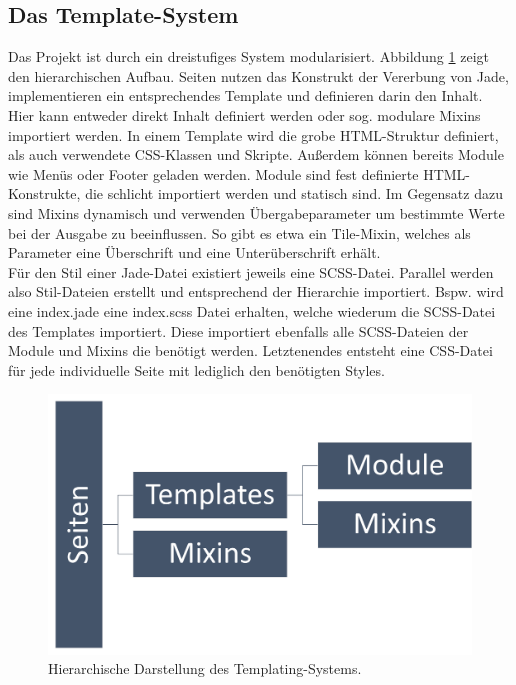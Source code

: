 \subsection{Das Template-System}
Das Projekt ist durch ein dreistufiges System modularisiert. Abbildung \ref{pre:system} zeigt den hierarchischen Aufbau. Seiten nutzen das Konstrukt der Vererbung von Jade, implementieren ein entsprechendes Template und definieren darin den Inhalt. Hier kann entweder direkt Inhalt definiert werden oder sog. modulare Mixins importiert werden.
In einem Template wird die grobe HTML-Struktur definiert, als auch verwendete CSS-Klassen und Skripte. Außerdem können bereits Module wie Menüs oder Footer geladen werden.
Module sind fest definierte HTML-Konstrukte, die schlicht importiert werden und statisch sind.
Im Gegensatz dazu sind Mixins dynamisch und verwenden Übergabeparameter um bestimmte Werte bei der Ausgabe zu beeinflussen. So gibt es etwa ein Tile-Mixin, welches als Parameter eine Überschrift und eine Unterüberschrift erhält.
\\
Für den Stil einer Jade-Datei existiert jeweils eine SCSS-Datei. Parallel werden also Stil-Dateien erstellt und entsprechend der Hierarchie importiert. Bspw. wird eine index.jade eine index.scss Datei erhalten, welche wiederum die SCSS-Datei des Templates importiert. Diese importiert ebenfalls alle SCSS-Dateien der Module und Mixins die benötigt werden.
Letztenendes entsteht eine CSS-Datei für jede individuelle Seite mit lediglich den benötigten Styles.

\begin{figure} [tp]
	\includegraphics[width=\textwidth]{./img/pre_system.png}
	\caption{Hierarchische Darstellung des Templating-Systems.}
	\label{pre:system}
\end{figure}